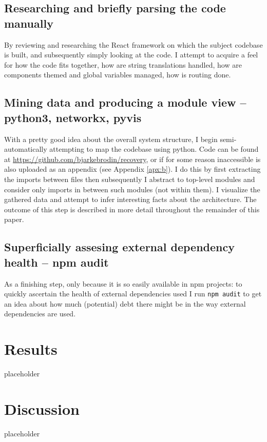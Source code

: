 \documentclass{article}
\begin{document}
\subsection{Researching and briefly parsing the code manually}

By reviewing and researching the React framework on which the subject codebase is built,
and subsequently simply looking at the code. 
I attempt to acquire a feel for how the code fits together,
how are string translations handled,
how are components themed and global variables managed,
how is routing done.

\subsection{Mining data and producing a module view -- python3, networkx, pyvis}

With a pretty good idea about the overall system structure,
I begin semi-automatically attempting to map the codebase using python.
Code can be found at \href{https://github.com/bjarkebrodin/recovery}{https://github.com/bjarkebrodin/recovery},
or if for some reason inaccessible is also uploaded as an appendix (see Appendix \ref{apx:b}).
I do this by first extracting the imports between files
then subsequently I abstract to top-level modules and consider only imports in between such modules (not within them).
I visualize the gathered data and attempt to infer interesting facts about the architecture.
The outcome of this step is described in more detail throughout the remainder of this paper.

\subsection{Superficially assesing external dependency health -- npm audit}

As a finishing step, only because it is so easily available in npm projects:
to quickly ascertain the health of external dependencies used I run \verb|npm audit|
to get an idea about how much (potential) debt there might be in the way external dependencies are used.



\section{Results}
placeholder


\section{Discussion}
placeholder
\end{document}
